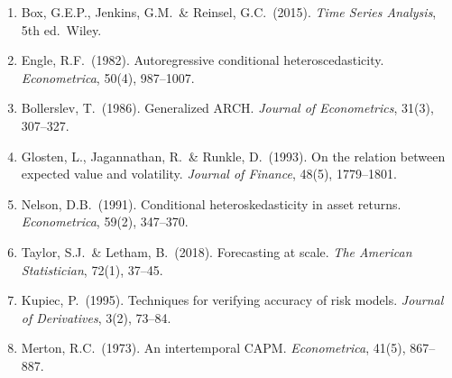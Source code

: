 \documentclass[12pt,letterpaper]{article}
\begin{document}
\begin{enumerate}
  \item Box, G.E.P., Jenkins, G.M.\ \& Reinsel, G.C.\ (2015).
    \textit{Time Series Analysis}, 5th ed.\ Wiley.
  \item Engle, R.F.\ (1982). Autoregressive conditional heteroscedasticity.
    \textit{Econometrica}, 50(4), 987--1007.
  \item Bollerslev, T.\ (1986). Generalized ARCH.
    \textit{Journal of Econometrics}, 31(3), 307--327.
  \item Glosten, L., Jagannathan, R.\ \& Runkle, D.\ (1993).
    On the relation between expected value and volatility.
    \textit{Journal of Finance}, 48(5), 1779--1801.
  \item Nelson, D.B.\ (1991). Conditional heteroskedasticity in asset returns.
    \textit{Econometrica}, 59(2), 347--370.
  \item Taylor, S.J.\ \& Letham, B.\ (2018). Forecasting at scale.
    \textit{The American Statistician}, 72(1), 37--45.
  \item Kupiec, P.\ (1995). Techniques for verifying accuracy of risk models.
    \textit{Journal of Derivatives}, 3(2), 73--84.
  \item Merton, R.C.\ (1973). An intertemporal CAPM.
    \textit{Econometrica}, 41(5), 867--887.
\end{enumerate}
\end{document}
